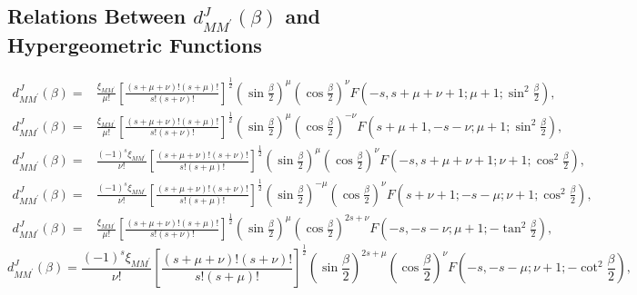 \subsection{Relations Between $d_{M M^{\prime}}^{J}(\beta)$ and Hypergeometric Functions}\label{4.3.5}
\begin{align}
d_{M M^{\prime}}^{J}(\beta)=&\frac{\xi_{M M^{\prime}}}{\mu!}\left[\frac{(s+\mu+\nu)!(s+\mu)!}{s!(s+\nu)!}\right]^{\frac{1}{2}}\left(\sin \frac{\beta}{2}\right)^{\mu}\left(\cos \frac{\beta}{2}\right)^{\nu} F\left(-s, s+\mu+\nu+1 ; \mu+1 ; \sin ^{2} \frac{\beta}{2}\right),  \label{eq:4:3:16}\\
d_{M M^{\prime}}^{J}(\beta)=&\frac{\xi_{M M^{\prime}}}{\mu!}\left[\frac{(s+\mu+\nu)!(s+\mu)!}{s!(s+\nu)!}\right]^{\frac{1}{2}}\left(\sin \frac{\beta}{2}\right)^{\mu}\left(\cos \frac{\beta}{2}\right)^{-\nu} F\left(s+\mu+1,-s-\nu ; \mu+1 ; \sin ^{2} \frac{\beta}{2}\right),  \label{eq:4:3:17}\\
d_{M M^{\prime}}^{J}(\beta)=&\frac{(-1)^{s} \xi_{M M^{\prime}}}{\nu!}\left[\frac{(s+\mu+\nu)!(s+\nu)!}{s!(s+\mu)!}\right]^{\frac{1}{2}}\left(\sin \frac{\beta}{2}\right)^{\mu}\left(\cos \frac{\beta}{2}\right)^{\nu} F\left(-s, s+\mu+\nu+1 ; \nu+1 ; \cos ^{2} \frac{\beta}{2}\right), \label{eq:4:3:18}
\end{align}
\begin{align}
d_{M M^{\prime}}^{J}(\beta)=&\frac{(-1)^{s} \xi_{M M^{\prime}}}{\nu!}\left[\frac{(s+\mu+\nu)!(s+\nu)!}{s!(s+\mu)!}\right]^{\frac{1}{2}}\left(\sin \frac{\beta}{2}\right)^{-\mu}\left(\cos \frac{\beta}{2}\right)^{\nu} F\left(s+\nu+1 ;-s-\mu ; \nu+1 ; \cos ^{2} \frac{\beta}{2}\right),  \label{eq:4:3:19}\\
d_{M M^{\prime}}^{J}(\beta)=&\frac{\xi_{M M^{\prime}}}{\mu!}\left[\frac{(s+\mu+\nu)!(s+\mu)!}{s!(s+\nu)!}\right]^{\frac{1}{2}}\left(\sin \frac{\beta}{2}\right)^{\mu}\left(\cos \frac{\beta}{2}\right)^{2 s+\nu} F\left(-s,-s-\nu ; \mu+1 ;-\tan ^{2} \frac{\beta}{2}\right), \label{eq:4:3:20}
\end{align}
\begin{equation}
d_{M M^{\prime}}^{J}(\beta)=\frac{(-1)^{s} \xi_{M M^{\prime}}}{\nu!}\left[\frac{(s+\mu+\nu)!(s+\nu)!}{s!(s+\mu)!}\right]^{\frac{1}{2}}\left(\sin \frac{\beta}{2}\right)^{2 s+\mu}\left(\cos \frac{\beta}{2}\right)^{\nu} F\left(-s,-s-\mu ; \nu+1 ;-\cot ^{2} \frac{\beta}{2}\right), \label{eq:4:3:21}
\end{equation}
